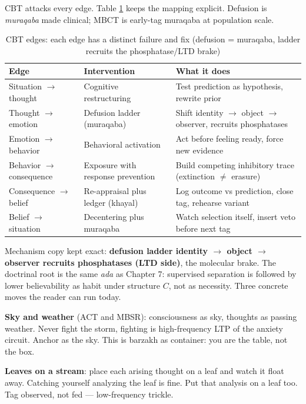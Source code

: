 CBT attacks every edge. Table \ref{tab:cbt-edges} keeps the mapping explicit. Defusion is \textit{muraqaba} made clinical; MBCT is early-tag muraqaba at population scale.

\begin{table}[h]
\centering
\small
\caption{CBT edges: each edge has a distinct failure and fix (defusion = muraqaba, ladder recruits the phosphatase/LTD brake)}
\label{tab:cbt-edges}
\begin{tabular}{p{2.6cm}p{3.4cm}p{4.4cm}}
\toprule
Edge & Intervention & What it does \\
\midrule
Situation $\to$ thought & Cognitive restructuring & Test prediction as hypothesis, rewrite prior \\
Thought $\to$ emotion & Defusion ladder (muraqaba) & Shift identity $\to$ object $\to$ observer, recruits phosphatases \\
Emotion $\to$ behavior & Behavioral activation & Act before feeling ready, force new evidence \\
Behavior $\to$ consequence & Exposure with response prevention & Build competing inhibitory trace (extinction $\neq$ erasure) \\
Consequence $\to$ belief & Re-appraisal plus ledger (khayal) & Log outcome vs prediction, close tag, rehearse variant \\
Belief $\to$ situation & Decentering plus muraqaba & Watch selection itself, insert veto before next tag \\
\bottomrule
\end{tabular}
\end{table}

Mechanism copy kept exact: \textbf{defusion ladder identity $\to$ object $\to$ observer recruits phosphatases (LTD side)}, the molecular brake. The doctrinal root is the same \textit{ada} as Chapter 7: supervised separation is followed by lower believability as habit under structure $C$, not as necessity. Three concrete moves the reader can run today.

\textbf{Sky and weather} (ACT and MBSR): consciousness as sky, thoughts as passing weather. Never fight the storm, fighting is high-frequency LTP of the anxiety circuit. Anchor as the sky. This is barzakh as container: you are the table, not the box.

\textbf{Leaves on a stream}: place each arising thought on a leaf and watch it float away. Catching yourself analyzing the leaf is fine. Put that analysis on a leaf too. Tag observed, not fed --- low-frequency trickle.

